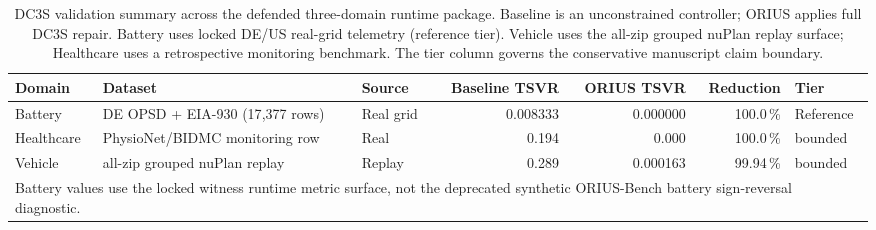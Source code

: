 \begin{table}[htbp]
\centering
\caption{DC3S validation summary across the defended three-domain runtime package.
Baseline is an unconstrained controller; ORIUS applies full DC3S repair.
Battery uses locked DE/US real-grid telemetry (reference tier).
Vehicle uses the all-zip grouped nuPlan replay surface; Healthcare uses a
retrospective monitoring benchmark.
The tier column governs the conservative manuscript claim boundary.}
\label{tab:real_data_validation}
\begin{tabular}{lllrrrl}
\toprule
\textbf{Domain} & \textbf{Dataset} & \textbf{Source} &
\textbf{Baseline TSVR} & \textbf{ORIUS TSVR} & \textbf{Reduction} & \textbf{Tier} \\
\midrule
Battery & DE OPSD + EIA-930 (17{,}377 rows) & Real grid & 0.008333 & 0.000000 & 100.0\,\% & Reference \\
\midrule
Healthcare  & PhysioNet/BIDMC monitoring row     & Real       & 0.194 & 0.000 & 100.0\,\% & bounded \\
\midrule
Vehicle     & all-zip grouped nuPlan replay      & Replay     & 0.289 & 0.000163 & 99.94\,\% & bounded \\
\bottomrule
\multicolumn{7}{l}{\small Battery values use the locked witness runtime metric surface, not the deprecated synthetic ORIUS-Bench battery sign-reversal diagnostic.}\\
\end{tabular}
\end{table}
